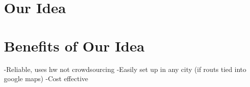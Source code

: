 \documentclass[pageno]{jpaper}
\begin{document}
\section{Our Idea}


\section{Benefits of Our Idea}

-Reliable, uses hw not crowdsourcing
-Easily set up in any city (if routs tied into google maps)
-Cost effective




\end{document}
